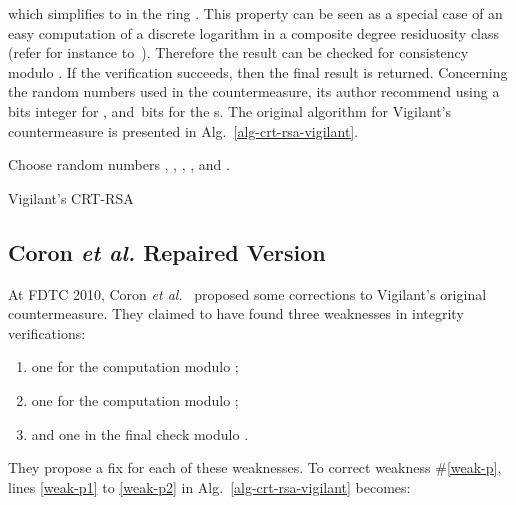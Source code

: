 \documentclass[10pt]{article}
\newcommand{\algorithmConfig}{
  \DontPrintSemicolon
	\SetKw{Or}{or}
	\SetKwInOut{Input}{Input}
	\SetKwInOut{Output}{Output}
}
\theoremstyle{definition}
\theoremstyle{theorem}
\newcommand{\etal}{\textit{et al.}\xspace}
\begin{document}
which simplifies to  in the ring .
This property can be seen as a special case of an easy computation of a discrete logarithm in a composite degree residuosity class
(refer for instance to~\cite{DBLP:conf/eurocrypt/Paillier99}).
Therefore the result  can be checked for consistency modulo .
If the verification  succeeds, then the final result  is returned.
Concerning the random numbers used in the countermeasure, its author recommend using a \,bits integer for , and \,bits for the s.
The original algorithm for Vigilant's countermeasure is presented in Alg.~\ref{alg-crt-rsa-vigilant}.

\begin{algorithm}
\algorithmConfig
{\smaller {}
\BlankLine
Choose random numbers , , , , and . \;
\BlankLine
 \;
 \;
 \;
 \;
 \;
 \;
\BlankLine
\If{}{
  \Return
}
\BlankLine
 \label{weak-p1} \;
 \;
\BlankLine
\If{}{
  \Return
} \label{weak-p2}
\BlankLine
\If{}{
  \Return
}
\BlankLine
 \;
\BlankLine
 \;
 \;
 \;
 \;
 \;
 \;
\BlankLine
\If{}{
  \Return
}
\BlankLine
\If{}{
  \Return
}
\BlankLine
 \label{weak-q1} \;
 \;
\BlankLine
\If{}{
  \Return
} \label{weak-q2}
\BlankLine
\If{}{
  \Return
}
\BlankLine
 \;
\BlankLine
 \;
 \label{weak-pq1} \;
\BlankLine
\If{}{
  \Return
} \label{weak-pq2}
\BlankLine
\If{}{
  \Return
}
\BlankLine
\Return \;
\caption{Vigilant's CRT-RSA}
} \label{alg-crt-rsa-vigilant}
\end{algorithm}

\subsection{Coron \etal Repaired Version}
\label{sec-vigilant-coron}

At FDTC 2010, Coron \etal~\cite{DBLP:conf/fdtc/CoronGMPV10} proposed some corrections to Vigilant's original countermeasure.
They claimed to have found three weaknesses in integrity verifications:
\begin{enumerate}
\item \label{weak-p} one for the computation modulo ;
\item \label{weak-q} one for the computation modulo ;
\item \label{weak-pq} and one in the final check modulo .
\end{enumerate}

They propose a fix for each of these weaknesses.
To correct weakness \#\ref{weak-p}, lines \ref{weak-p1} to \ref{weak-p2} in Alg.~\ref{alg-crt-rsa-vigilant} becomes:
\end{document}
